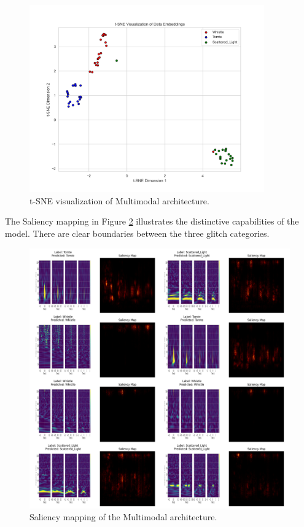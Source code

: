 \begin{figure}[H]
    \centering
    \includegraphics[width=0.9\textwidth]{Grad Assignment/Images/tSNE_RQ3_ImageModel_test.png}
    \caption{t-SNE visualization of Multimodal architecture.}
    \label{fig:tsne_multimodal}
\end{figure}
\newpage
The Saliency mapping in Figure \ref{fig:saliency_mapping_multimodal} illustrates the distinctive capabilities of the model. There are clear boundaries between the three glitch categories. 
\begin{figure}[H]
    \centering
    \includegraphics[width=1.0\textwidth]{Grad Assignment/Images/SaliencyMapping_Multimodal_test.png}
    \caption{Saliency mapping of the Multimodal architecture.}
    \label{fig:saliency_mapping_multimodal}
\end{figure}
